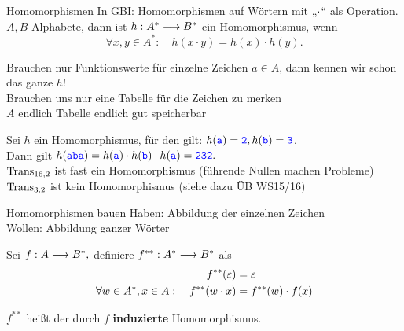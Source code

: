 \begin{frame}{Homomorphismen}
	In GBI: Homomorphismen auf Wörtern mit „$\cdot$“ als Operation.\\
	\impl $A, B$ Alphabete, dann ist $h: A^* \longrightarrow B^*$ ein Homomorphismus, wenn
	$$ \forall x, y \in A^* : \quad h(x \cdot y) = h(x) \cdot h(y). $$
	
	\pause
	\impl Brauchen nur Funktionswerte für einzelne Zeichen $a \in A$, dann kennen wir schon das ganze $h$! \\
	\impl Brauchen uns nur eine Tabelle für die Zeichen zu merken \\
	\impl $A$ endlich \impl Tabelle endlich \impl gut speicherbar
	
	\pause
	\begin{Beispiel}
		Sei $h$ ein Homomorphismus, für den gilt: $h(\hbox{\textcolor{blue}{\texttt{a}}}) = \hbox{\textcolor{blue}{\texttt{2}}}, h(\hbox{\textcolor{blue}{\texttt{b}}}) = \hbox{\textcolor{blue}{\texttt{3}}}$. \\
		Dann gilt $h(\hbox{\textcolor{blue}{\texttt{aba}}}) = h(\hbox{\textcolor{blue}{\texttt{a}}}) \cdot h(\hbox{\textcolor{blue}{\texttt{b}}}) \cdot h(\hbox{\textcolor{blue}{\texttt{a}}}) = \hbox{\textcolor{blue}{\texttt{232}}}. $ \\[0.5em]
		$\text{Trans}_{16,2}$ ist fast ein Homomorphismus (führende Nullen machen Probleme)\\
		$\text{Trans}_{3,2}$ ist kein Homomorphismus (siehe dazu ÜB WS15/16)
	\end{Beispiel}
\end{frame}

\begin{frame}{Homomorphismen bauen}
	Haben: Abbildung der einzelnen Zeichen \\
	Wollen: Abbildung ganzer Wörter 
	\begin{Definition}
		Sei $f: A \longrightarrow B^*,$ \pause definiere $f^{**}:A^* \longrightarrow B^*$ als
		\begin{align*}
		f^{**}(\varepsilon) &= \varepsilon  \\
		\forall w\in A^*, x\in A: \quad  f^{**}(w \cdot x) &= f^{**}(w) \cdot f(x)       
		\end{align*}
	\end{Definition}

	$f^{**}$ heißt der durch $f$ \textbf{induzierte} Homomorphismus.
\end{frame}

